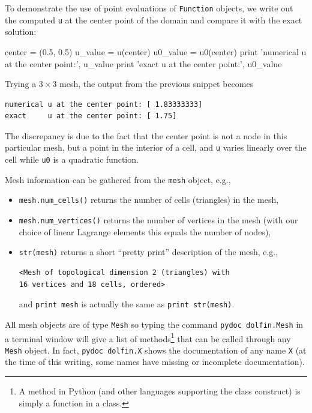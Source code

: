 To demonstrate the use of point evaluations of {\fontsize{10pt}{10pt}\verb!Function!} objects,
we write out the computed {\fontsize{10pt}{10pt}\verb!u!} at the center point
of the domain and compare it with the exact solution:
\begin{python}
center = (0.5, 0.5)
u_value = u(center)
u0_value = u0(center)
print 'numerical u at the center point:', u_value
print 'exact     u at the center point:', u0_value
\end{python}
Trying a $3\times 3$ mesh, the output from the
previous snippet becomes
\begin{Verbatim}[fontsize=\fontsize{10pt}{10pt},tabsize=8,baselinestretch=0.85,
fontfamily=tt,xleftmargin=7mm]
numerical u at the center point: [ 1.83333333]
exact     u at the center point: [ 1.75]
\end{Verbatim}
\noindent
The discrepancy is due to the fact that the center point is not a node
in this particular mesh, but a point in the interior of a cell,
and {\fontsize{10pt}{10pt}\verb!u!} varies linearly over the cell while
{\fontsize{10pt}{10pt}\verb!u0!} is a quadratic function.

Mesh information can be gathered from the {\fontsize{10pt}{10pt}\verb!mesh!} object, e.g.,
\begin{itemize}
\item {\fontsize{10pt}{10pt}\verb!mesh.num_cells()!} returns the number of cells (triangles) in
the mesh, 
\item {\fontsize{10pt}{10pt}\verb!mesh.num_vertices()!} returns the number of vertices
in the mesh (with our choice of linear Lagrange elements this equals
the number of nodes),
\item {\fontsize{10pt}{10pt}\verb!str(mesh)!} returns
a short ``pretty print''
description of the mesh, e.g.,
\begin{Verbatim}[fontsize=\fontsize{10pt}{10pt},tabsize=8,baselinestretch=0.85,
fontfamily=tt,xleftmargin=7mm]
<Mesh of topological dimension 2 (triangles) with 
16 vertices and 18 cells, ordered>
\end{Verbatim}
\noindent
and {\fontsize{10pt}{10pt}\texttt{print mesh}} is actually the same as {\fontsize{10pt}{10pt}\texttt{print str(mesh)}}.
\end{itemize}
All mesh objects are of type {\fontsize{10pt}{10pt}\texttt{Mesh}} so typing the command
{\fontsize{10pt}{10pt}\texttt{pydoc dolfin.Mesh}} in a terminal window
will give a list of methods\footnote{A method in Python (and other
languages supporting the class construct) is simply a
function in a class.} that can be called through any
{\fontsize{10pt}{10pt}\texttt{Mesh}} object. In fact, {\fontsize{10pt}{10pt}\texttt{pydoc dolfin.X}} shows the
documentation of
any \dolfin{} name {\fontsize{10pt}{10pt}\texttt{X}} (at the time of this writing, some names
have missing or incomplete documentation).


